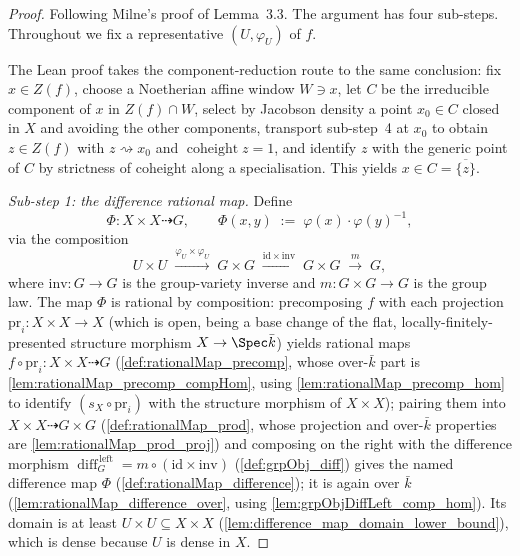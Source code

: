 \begin{proof}\leanok
  Following Milne's proof of Lemma~3.3. The argument has four sub-steps. Throughout we
  fix a representative \((U, \varphi_U)\) of \(f\).

  The Lean proof takes the component-reduction route to the same conclusion: fix
  \(x \in Z(f)\), choose a Noetherian affine window \(W \ni x\), let \(C\) be the
  irreducible component of \(x\) in \(Z(f) \cap W\), select by Jacobson density a point
  \(x_0 \in C\) closed in \(X\) and avoiding the other components, transport
  sub-step~4 at \(x_0\) to obtain \(z \in Z(f)\) with \(z \rightsquigarrow x_0\) and
  \(\operatorname{coheight} z = 1\), and identify \(z\) with the generic point of \(C\)
  by strictness of coheight along a specialisation. This yields
  \(x \in C = \overline{\{z\}}\).

  \emph{Sub-step 1: the difference rational map.} Define
  \[
    \Phi \colon X \times X \dashrightarrow G,
    \qquad
    \Phi(x, y) \;:=\; \varphi(x) \cdot \varphi(y)^{-1},
  \]
  via the composition
  \[
    U \times U
    \;\xrightarrow{\varphi_U \times \varphi_U}\; G \times G
    \;\xrightarrow{\mathrm{id} \times \mathrm{inv}}\; G \times G
    \;\xrightarrow{m}\; G,
  \]
  where \(\mathrm{inv} \colon G \to G\) is the group-variety inverse and
  \(m \colon G \times G \to G\) is the group law. The map \(\Phi\) is rational by
  composition: precomposing \(f\) with each projection
  \(\mathrm{pr}_i \colon X \times X \to X\) (which is open, being a base change of the
  flat, locally-finitely-presented structure morphism \(X \to \Spec \bar k\)) yields
  rational maps \(f \circ \mathrm{pr}_i \colon X \times X \dashrightarrow G\)
  (\cref{def:rationalMap_precomp}, whose over-\(\bar k\) part is
  \cref{lem:rationalMap_precomp_compHom}, using \cref{lem:rationalMap_precomp_hom} to
  identify \((s_X \circ \mathrm{pr}_i)\) with the structure morphism of \(X \times X\));
  pairing them into \(X \times X \dashrightarrow
  G \times G\) (\cref{def:rationalMap_prod}, whose projection and over-\(\bar k\) properties
  are \cref{lem:rationalMap_prod_proj}) and composing on the right with the difference
  morphism \(\operatorname{diff}_G^{\,\mathrm{left}} = m \circ (\mathrm{id} \times \mathrm{inv})\)
  (\cref{def:grpObj_diff}) gives the named difference map \(\Phi\)
  (\cref{def:rationalMap_difference}); it is again over \(\bar k\)
  (\cref{lem:rationalMap_difference_over}, using \cref{lem:grpObjDiffLeft_comp_hom}). Its
  domain is at least \(U \times U \subseteq X \times X\)
  (\cref{lem:difference_map_domain_lower_bound}), which is dense because \(U\) is
  dense in \(X\).


\end{proof}
